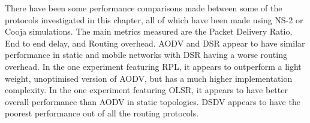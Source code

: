     There have been some performance comparisons made between some of the
    protocols investigated in this chapter, all of which have been made using
    NS-2 or Cooja simulations. The main metrics measured are the Packet Delivery
    Ratio, End to end delay, and Routing overhead. AODV and DSR appear to have
    similar performance in static and mobile networks with DSR having a worse
    routing overhead. In the one experiment featuring RPL, it appears to outperform
    a light weight, unoptimised version of AODV, but has a much higher implementation
    complexity. In the one experiment featuring OLSR, it appears to have
    better overall performance than AODV in static topologies. DSDV appears to have
    the poorest performance out of all the routing protocols.
